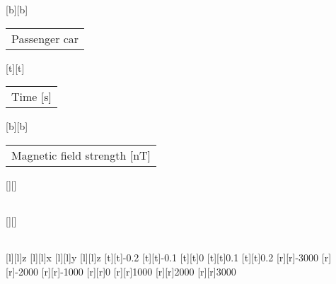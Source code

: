 %
[b][b]{\fontsize{8}{12}\selectfont \setlength{\tabcolsep}{0pt}\begin{tabular}{c}Passenger car\end{tabular}}%
[t][t]{\fontsize{8}{12}\selectfont \setlength{\tabcolsep}{0pt}\begin{tabular}{c}Time [s]\end{tabular}}%
[b][b]{\fontsize{8}{12}\selectfont \setlength{\tabcolsep}{0pt}\begin{tabular}{c}Magnetic field strength [nT]\end{tabular}}%
[][]{\fontsize{10}{15}\selectfont \setlength{\tabcolsep}{0pt}\begin{tabular}{c} \end{tabular}}%
[][]{\fontsize{10}{15}\selectfont \setlength{\tabcolsep}{0pt}\begin{tabular}{c} \end{tabular}}%
[l][l]{\fontsize{6}{15}\selectfont z}%
[l][l]{\fontsize{6}{15}\selectfont x}%
[l][l]{\fontsize{6}{15}\selectfont y}%
[l][l]{\fontsize{6}{15}\selectfont z}%
%
\fontsize{6}{15}%
\selectfont%
%
[t][t]{-0.2}%
[t][t]{-0.1}%
[t][t]{0}%
[t][t]{0.1}%
[t][t]{0.2}%
%
[r][r]{-3000}%
[r][r]{-2000}%
[r][r]{-1000}%
[r][r]{0}%
[r][r]{1000}%
[r][r]{2000}%
[r][r]{3000}%
%
